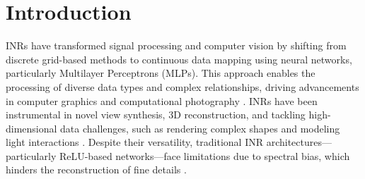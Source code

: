 \section{Introduction}
\label{sec:intro}

INRs have transformed signal processing and computer vision by shifting from discrete grid-based methods to continuous data mapping using neural networks, particularly Multilayer Perceptrons (MLPs). This approach enables the processing of diverse data types and complex relationships, driving advancements in computer graphics and computational photography \citep{mildenhall2020nerf, Siren, tancik2020fourier}. INRs have been instrumental in novel view synthesis, 3D reconstruction, and tackling high-dimensional data challenges, such as rendering complex shapes and modeling light interactions \citep{mildenhall2020nerf, Siren, chen2021learning, mescheder2019occupancy, saragadam2022miner}. Despite their versatility, traditional INR architectures—particularly ReLU-based networks—face limitations due to spectral bias, which hinders the reconstruction of fine details \citep{rahaman2019spectral}.


